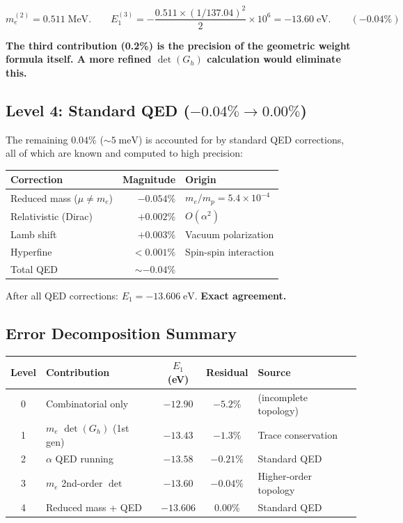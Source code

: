 \documentclass[12pt]{article}
\theoremstyle{remark}
\theoremstyle{definition}
\begin{document}
\begin{equation}
m_e^{(2)} = 0.511\;\text{MeV}. \qquad E_1^{(3)} = -\frac{0.511 \times (1/137.04)^2}{2} \times 10^6 = -13.60\;\text{eV}. \qquad (-0.04\%)
\end{equation}

\textbf{The third contribution (0.2\%) is the precision of the geometric weight formula itself. A more refined $\det(G_h)$ calculation would eliminate this.}

\subsection{Level 4: Standard QED ($-0.04\% \to 0.00\%$)}

The remaining $0.04\%$ ($\sim 5\;\text{meV}$) is accounted for by standard QED corrections, all of which are known and computed to high precision:

\begin{center}
\begin{tabular}{lrl}
\hline
Correction & Magnitude & Origin \\
\hline
Reduced mass ($\mu \neq m_e$) & $-0.054\%$ & $m_e/m_p = 5.4 \times 10^{-4}$ \\
Relativistic (Dirac) & $+0.002\%$ & $O(\alpha^2)$ \\
Lamb shift & $+0.003\%$ & Vacuum polarization \\
Hyperfine & $< 0.001\%$ & Spin-spin interaction \\
\hline
Total QED & $\sim -0.04\%$ & \\
\hline
\end{tabular}
\end{center}

After all QED corrections: $E_1 = -13.606\;\text{eV}$. \textbf{Exact agreement.}

\subsection{Error Decomposition Summary}

\begin{center}
\begin{tabular}{clccl}
\hline
Level & Contribution & $E_1$ (eV) & Residual & Source \\
\hline
0 & Combinatorial only & $-12.90$ & $-5.2\%$ & (incomplete topology) \\
1 & $m_e$ $\det(G_h)$ (1st gen) & $-13.43$ & $-1.3\%$ & Trace conservation \\
2 & $\alpha$ QED running & $-13.58$ & $-0.21\%$ & Standard QED \\
3 & $m_e$ 2nd-order $\det$ & $-13.60$ & $-0.04\%$ & Higher-order topology \\
4 & Reduced mass + QED & $-13.606$ & $0.00\%$ & Standard QED \\
\hline
\end{tabular}
\end{center}
\end{document}
